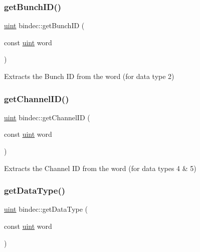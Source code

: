 \subsubsection{\texorpdfstring{get\+Bunch\+I\+D()}{getBunchID()}}
{\footnotesize\ttfamily \hyperlink{namespacebindec_a61700e6ffcfc677215bfdf223803e735}{uint} bindec\+::get\+Bunch\+ID (\begin{DoxyParamCaption}\item[{const \hyperlink{namespacebindec_a61700e6ffcfc677215bfdf223803e735}{uint}}]{word }\end{DoxyParamCaption})\hspace{0.3cm}{\ttfamily [inline]}}



Extracts the Bunch ID from the word (for data type 2) 

\mbox{\label{namespacebindec_af1997af0743251d010780a8f728fcd7e}} 
\subsubsection{\texorpdfstring{get\+Channel\+I\+D()}{getChannelID()}}
{\footnotesize\ttfamily \hyperlink{namespacebindec_a61700e6ffcfc677215bfdf223803e735}{uint} bindec\+::get\+Channel\+ID (\begin{DoxyParamCaption}\item[{const \hyperlink{namespacebindec_a61700e6ffcfc677215bfdf223803e735}{uint}}]{word }\end{DoxyParamCaption})\hspace{0.3cm}{\ttfamily [inline]}}



Extracts the Channel ID from the word (for data types 4 \& 5) 

\mbox{\label{namespacebindec_a7a98adfd04c65f870f74a423bfd744fe}} 
\subsubsection{\texorpdfstring{get\+Data\+Type()}{getDataType()}}
{\footnotesize\ttfamily \hyperlink{namespacebindec_a61700e6ffcfc677215bfdf223803e735}{uint} bindec\+::get\+Data\+Type (\begin{DoxyParamCaption}\item[{const \hyperlink{namespacebindec_a61700e6ffcfc677215bfdf223803e735}{uint}}]{word }\end{DoxyParamCaption})\hspace{0.3cm}{\ttfamily [inline]}}



